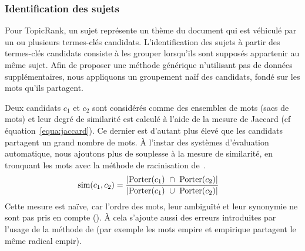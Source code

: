       \subsubsection{Identification des sujets}
      \label{subsubsec:main:domain_independent_keyphrase_extraction-unsupervised_automatic_keyphrase_extraction-topicrank-topic_identification}
        Pour TopicRank, un sujet représente un thème du document qui est
        véhiculé par un ou plusieurs termes-clés candidats.
%
%
        L'identification des sujets à partir des termes-clés candidats consiste
        à les grouper lorsqu'ils sont supposés appartenir au même sujet. Afin de
        proposer une méthode générique n'utilisant pas de données
        supplémentaires, nous appliquons un groupement \og{}naïf\fg{} des
        candidats, fondé sur les mots qu'ils partagent.

        Deux candidats $c_1$ et $c_2$ sont considérés comme des ensembles de
        mots (sacs de mots) et leur degré de similarité est calculé à l'aide de
        la mesure de Jaccard (cf équation~\ref{equa:jaccard}). Ce dernier est
        d'autant plus élevé que les candidats partagent un grand nombre de mots.
        À l'instar des systèmes d'évaluation automatique, nous ajoutons plus de
        souplesse à la mesure de similarité, en tronquant les mots avec la
        méthode de racinisation de~.
        \begin{align}
          \text{sim}(c_1, c_2) &= \frac{|\textnormal{Porter}(c_1)\ \cap\ \textnormal{Porter}(c_2)|}{|\textnormal{Porter}(c_1)\ \cup\ \textnormal{Porter}(c_2)|} \label{equa:jaccard}
        \end{align}
        Cette mesure est \og{}naïve\fg{}, car l'ordre des mots, leur ambiguïté
        et leur synonymie ne sont pas pris en compte (). À cela
        s'ajoute aussi des erreurs introduites par l'usage de la méthode de
         (par exemple les mots
        \og{}empire\fg{} et \og{}empirique\fg{} partagent le même radical
        \og{}empir\fg{}).

